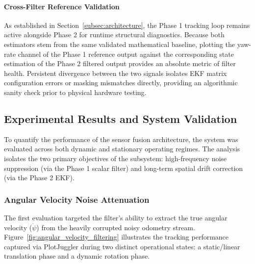 \paragraph{Cross-Filter Reference Validation}
As established in Section~\ref{subsec:architecture}, the Phase 1 tracking loop remains active alongside Phase 2 for runtime structural diagnostics. Because both estimators stem from the same validated mathematical baseline, plotting the yaw-rate channel of the Phase 1 reference output against the corresponding state estimation of the Phase 2 filtered output provides an absolute metric of filter health. Persistent divergence between the two signals isolates EKF matrix configuration errors or masking mismatches directly, providing an algorithmic sanity check prior to physical hardware testing.

\subsection{Experimental Results and System Validation}
\label{subsec:results}

To quantify the performance of the sensor fusion architecture, the system was evaluated across both dynamic and stationary operating regimes. The analysis isolates the two primary objectives of the subsystem: high-frequency noise suppression (via the Phase 1 scalar filter) and long-term spatial drift correction (via the Phase 2 EKF).

\subsubsection{Angular Velocity Noise Attenuation}

The first evaluation targeted the filter's ability to extract the true angular velocity ($\dot{\psi}$) from the heavily corrupted noisy odometry stream. Figure~\ref{fig:angular_velocity_filtering} illustrates the tracking performance captured via PlotJuggler during two distinct operational states: a static/linear translation phase and a dynamic rotation phase.

